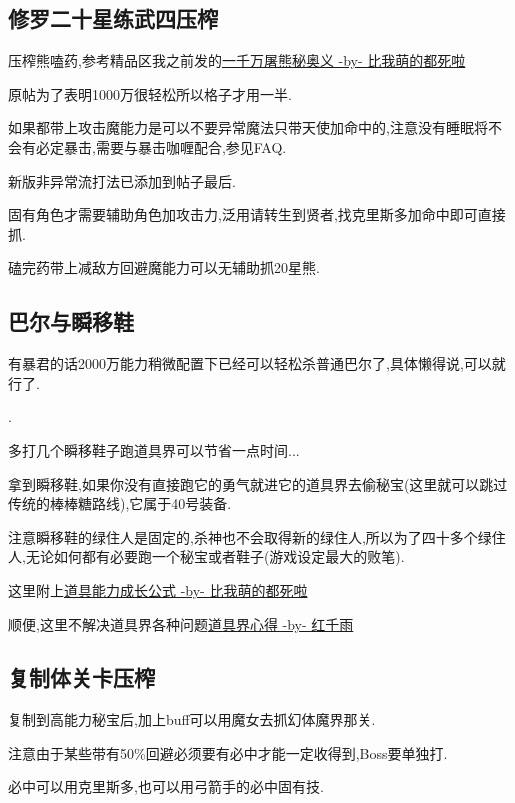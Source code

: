 		\subsection{修罗二十星练武四压榨}

		压榨熊嗑药,参考精品区我之前发的\href{http://tieba.baidu.com/p/3825275063}{一千万屠熊秘奥义 -by- 比我萌的都死啦}

		原帖为了表明1000万很轻松所以格子才用一半.

		如果都带上攻击魔能力是可以不要异常魔法只带天使加命中的,注意没有睡眠将不会有必定暴击,需要与暴击咖喱配合,参见FAQ.

		新版非异常流打法已添加到帖子最后.

		固有角色才需要辅助角色加攻击力,泛用请转生到贤者,找克里斯多加命中即可直接抓.

		磕完药带上减敌方回避魔能力可以无辅助抓20星熊.

		\subsection{巴尔与瞬移鞋}

		有暴君的话2000万能力稍微配置下已经可以轻松杀普通巴尔了,具体懒得说,可以就行了.

		{\color{red}{即便没有这里也建议用2000万能力挑战下,整个游戏挑战关已经没几个了,如果觉得困难可以参考后面修罗篇的巴尔攻略}}.

		多打几个瞬移鞋子跑道具界可以节省一点时间...

		拿到瞬移鞋,如果你没有直接跑它的勇气就进它的道具界去偷秘宝(这里就可以跳过传统的棒棒糖路线),它属于40号装备.

		注意瞬移鞋的绿住人是固定的,杀神也不会取得新的绿住人,所以为了四十多个绿住人,无论如何都有必要跑一个秘宝或者鞋子(游戏设定最大的败笔).

		这里附上\href{http://tieba.baidu.com/f?kz=3834692385}{道具能力成长公式 -by- 比我萌的都死啦}

		顺便,这里不解决道具界各种问题\href{http://tieba.baidu.com/p/3730196003}{道具界心得 -by- 红千雨}

		\subsection{复制体关卡压榨}

		复制到高能力秘宝后,加上buff可以用魔女去抓幻体魔界那关.

		注意由于某些带有50\%回避必须要有必中才能一定收得到,Boss要单独打.

		必中可以用克里斯多,也可以用弓箭手的必中固有技.
	
